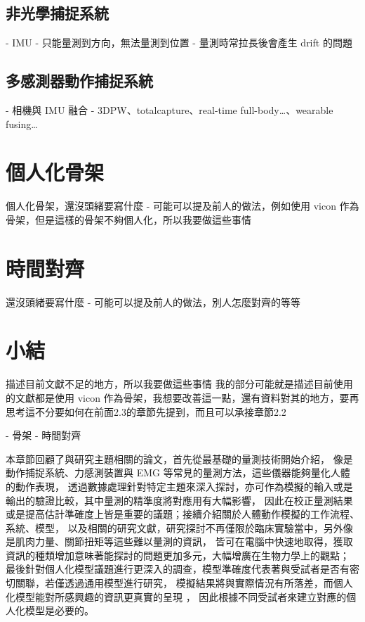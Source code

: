 \subsection{非光學捕捉系統}
- IMU
    - 只能量測到方向，無法量測到位置
    - 量測時常拉長後會產生 drift 的問題

\subsection{多感測器動作捕捉系統}
- 相機與 IMU 融合
- 3DPW、totalcapture、real-time full-body…、wearable fusing…

\section{個人化骨架}
個人化骨架，還沒頭緒要寫什麼
- 可能可以提及前人的做法，例如使用 vicon 作為骨架，但是這樣的骨架不夠個人化，所以我要做這些事情

\section{時間對齊}
還沒頭緒要寫什麼
- 可能可以提及前人的做法，別人怎麼對齊的等等

\section{小結}
描述目前文獻不足的地方，所以我要做這些事情
我的部分可能就是描述目前使用的文獻都是使用 vicon 作為骨架，我想要改善這一點，還有資料對其的地方，要再思考這不分要如何在前面2.3的章節先提到，而且可以承接章節2.2

- 骨架
- 時間對齊

本章節回顧了與研究主題相關的論文，首先從最基礎的量測技術開始介紹，
像是動作捕捉系統、力感測裝置與 EMG 等常見的量測方法，這些儀器能夠量化人體的動作表現，
透過數據處理針對特定主題來深入探討，亦可作為模擬的輸入或是輸出的驗證比較，其中量測的精準度將對應用有大幅影響，
因此在校正量測結果或是提高估計準確度上皆是重要的議題；接續介紹關於人體動作模擬的工作流程、系統、模型，
以及相關的研究文獻，研究探討不再僅限於臨床實驗當中，另外像是肌肉力量、關節扭矩等這些難以量測的資訊，
皆可在電腦中快速地取得，獲取資訊的種類增加意味著能探討的問題更加多元，大幅增廣在生物力學上的觀點；
最後針對個人化模型議題進行更深入的調查，模型準確度代表著與受試者是否有密切關聯，若僅透過通用模型進行研究，
模擬結果將與實際情況有所落差，而個人化模型能對所感興趣的資訊更真實的呈現 \cite{akhundov2022subject}，
因此根據不同受試者來建立對應的個人化模型是必要的。

